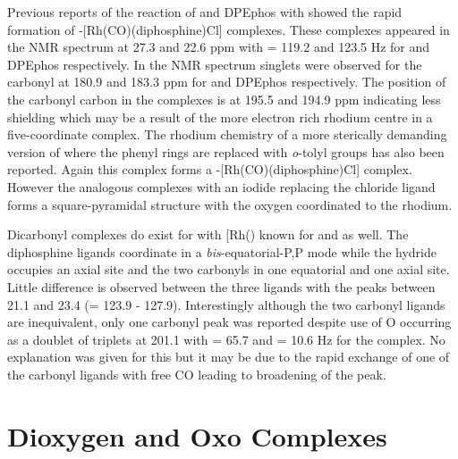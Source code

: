 Previous reports of the reaction of \Phxantphos{} and DPEphos with  showed the rapid formation of \trans-{[Rh(CO)(diphosphine)Cl]} complexes.\cite{Deb2010}  These complexes appeared in the \phosphorus{} NMR spectrum at 27.3 and 22.6 ppm with \JRhP = 119.2 and 123.5 Hz for \Phxantphos{} and DPEphos respectively.  In the \carbon{} NMR spectrum singlets were observed for the carbonyl at 180.9 and 183.3 ppm for \Phxantphos and DPEphos respectively.  The position of the carbonyl carbon in the \tBuxantphos{} complexes is at 195.5 and 194.9 ppm indicating less shielding which may be a result of the more electron rich rhodium centre in a five-coordinate complex.  The rhodium chemistry of a more sterically demanding version of \Phxantphos{} where the phenyl rings are replaced with \emph{o}-tolyl groups has also been reported.\cite{Williams2011}  Again this complex forms a \trans-[Rh(CO)(diphosphine)Cl] complex.  However the analogous complexes with an iodide replacing the chloride ligand forms a square-pyramidal structure with the oxygen coordinated to the rhodium.  

Dicarbonyl complexes do exist for \Phxantphos{} with [Rh(\Phxantphos)\ce{(CO)2H]} known for \Phsixantphos{} and \Phthixantphos{} as well.\cite{Kranenburg1995}  The diphosphine ligands coordinate in a \emph{bis}-equatorial-\dento{}P,P mode while the hydride occupies an axial site and the two carbonyls in one equatorial and one axial site.  Little difference is observed between the three ligands with the \phosphorus{} peaks between 21.1 and 23.4 (\JRhP = 123.9 - 127.9).  Interestingly although the two carbonyl ligands are inequivalent, only one carbonyl peak was reported despite use of \carbon O occurring as a doublet of triplets at 201.1 with \JRhC{} = 65.7 and \JPC = 10.6 Hz for the \Phxantphos{} complex.  No explanation was given for this but it may be due to the rapid exchange of one of the carbonyl ligands with free CO leading to broadening of the peak.  


\section{Dioxygen and Oxo Complexes}

